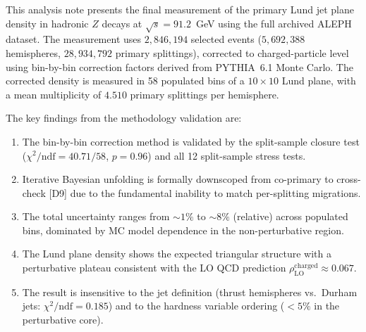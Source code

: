 \documentclass[11pt,a4paper]{article}
\begin{document}
This analysis note presents the final measurement of the primary Lund
jet plane density in hadronic $Z$ decays at $\sqrt{s} = 91.2$~GeV
using the full archived ALEPH dataset.  The measurement uses
$2{,}846{,}194$ selected events ($5{,}692{,}388$ hemispheres,
$28{,}934{,}792$ primary splittings), corrected to charged-particle
level using bin-by-bin correction factors derived from PYTHIA~6.1 Monte
Carlo.  The corrected density is measured in 58 populated bins of a
$10 \times 10$ Lund plane, with a mean multiplicity of $4.510$ primary
splittings per hemisphere.

The key findings from the methodology validation are:
\begin{enumerate}
\item The bin-by-bin correction method is validated by the
  split-sample closure test ($\chi^2/\text{ndf} = 40.71/58$,
  $p = 0.96$) and all 12 split-sample stress tests.
\item Iterative Bayesian unfolding is formally downscoped from
  co-primary to cross-check [D9] due to the fundamental inability
  to match per-splitting migrations.
\item The total uncertainty ranges from $\sim\!1\%$ to $\sim\!8\%$
  (relative) across populated bins, dominated by MC model dependence
  in the non-perturbative region.
\item The Lund plane density shows the expected triangular structure
  with a perturbative plateau consistent with the LO QCD prediction
  $\rho_\text{LO}^\text{charged} \approx 0.067$.
\item The result is insensitive to the jet definition (thrust
  hemispheres vs.\ Durham jets: $\chi^2/\text{ndf} = 0.185$) and
  to the hardness variable ordering ($<\!5\%$ in the perturbative core).
\end{enumerate}
\end{document}
